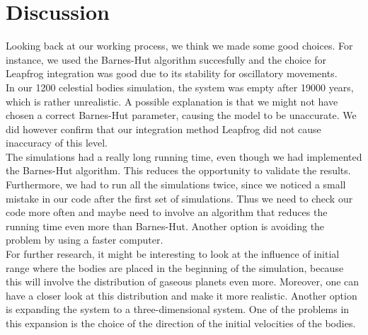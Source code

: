 \section{Discussion}
Looking back at our working process, we think we made some good choices.
For instance, we used the Barnes-Hut algorithm succesfully and the choice for Leapfrog integration was good due to its stability for oscillatory movements.\\

In our 1200 celestial bodies simulation, the system was empty after 19000 years, which is rather unrealistic. A possible explanation is that we might not have chosen a correct Barnes-Hut parameter, causing the model to be unaccurate. We did however confirm that our integration method Leapfrog did not cause inaccuracy of this level.\\

The simulations had a really long running time, even though we had implemented the Barnes-Hut algorithm. This reduces the opportunity to validate the results.
Furthermore, we had to run all the simulations twice, since we noticed a small mistake in our code after the first set of simulations. 
Thus we need to check our code more often and maybe need to involve an algorithm that reduces the running time even more than Barnes-Hut.
Another option is avoiding the problem by using a faster computer.\\

For further research, it might be interesting to look at the influence of initial range where the bodies are placed in the beginning of the simulation, because this will involve the distribution of gaseous planets even more.
Moreover, one can have a closer look at this distribution and make it more realistic.
Another option is expanding the system to a three-dimensional system.
One of the problems in this expansion is the choice of the direction of the initial velocities of the bodies.



